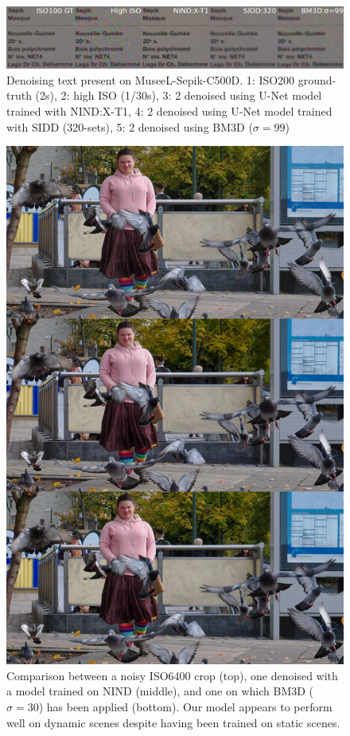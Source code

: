 \documentclass[10pt,twocolumn,letterpaper]{article}
\makeatletter
\newcommand\footnoteref[1]{\protected@xdef\@thefnmark{\ref{#1}}\@footnotemark}
\makeatother
\begin{document}
\begin{figure}[!htbp]
\centering
\includegraphics[width=1\linewidth]{txt.jpg}
\caption[caption for sepiktext]{Denoising text present on MuseeL-Sepik-C500D. 1: ISO200 ground-truth (2s), 2: high ISO (1/30s), 3: 2 denoised using U-Net model trained with NIND:X-T1, 4: 2 denoised using U-Net model trained with SIDD (320-sets), 5: 2 denoised using BM3D ($\sigma=99$\footnoteref{sigmanote})}
\label{fig:text}
\vspace{-0.2cm} 
\end{figure}

\begin{figure}[!htbp]
\centering
\includegraphics[width=1\linewidth]{comp-noisy-nind-bm3d30.jpg}
\caption[pigeoncaption]{Comparison between a noisy ISO6400 crop (top), one denoised with a model trained on NIND (middle), and one on which BM3D ($\sigma=30$) has been applied (bottom). Our model appears to perform well on dynamic scenes despite having been trained on static scenes.}
\label{fig:visualpigeons}
\vspace{-0.5cm} 
\end{figure}
\end{document}
